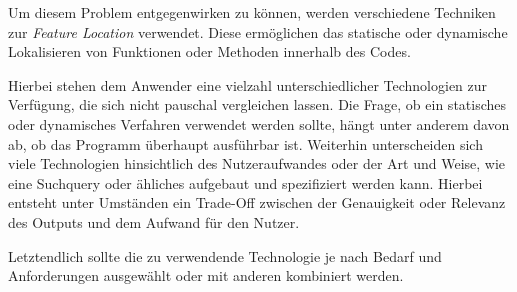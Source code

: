 \documentclass[runningheads,a4paper]{llncs}
\begin{document}
Um diesem Problem entgegenwirken zu können, werden verschiedene Techniken zur \textit{Feature Location} verwendet. Diese ermöglichen das statische oder dynamische Lokalisieren von Funktionen oder Methoden innerhalb des Codes.

Hierbei stehen dem Anwender eine vielzahl unterschiedlicher Technologien zur Verfügung, die sich nicht pauschal vergleichen lassen. Die Frage, ob ein statisches oder dynamisches Verfahren verwendet werden sollte, hängt unter anderem davon ab, ob das Programm überhaupt ausführbar ist. Weiterhin unterscheiden sich viele Technologien hinsichtlich des Nutzeraufwandes oder der Art und Weise, wie eine Suchquery oder ähliches aufgebaut und spezifiziert werden kann. Hierbei entsteht unter Umständen ein Trade-Off zwischen der Genauigkeit oder Relevanz des Outputs und dem Aufwand für den Nutzer.

Letztendlich sollte die zu verwendende Technologie je nach Bedarf und Anforderungen ausgewählt oder mit anderen kombiniert werden.




\clearpage

{}


\end{document}
